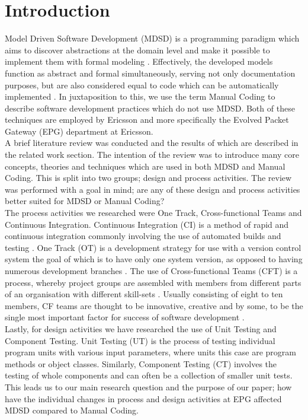 \documentclass[fina_report_innit.tex]{subfiles}
\begin{document}
\section{Introduction}

Model Driven Software Development (MDSD) is a programming paradigm which aims to discover abstractions at the domain level and make it possible to implement them with formal modeling \cite{stahl2006model}. Effectively, the developed models function as abstract and formal simultaneously, serving not only documentation purposes, but are also considered equal to code which can be automatically implemented \cite{stahl2006model}. In juxtaposition to this, we use the term Manual Coding to describe software development practices which do not use MDSD. Both of these techniques are employed by Ericsson and more specifically the Evolved Packet Gateway (EPG) department at Ericsson.
\\

A brief literature review was conducted and the results of which are described in the related work section. The intention of the review was to introduce many core concepts, theories and techniques which are used in both MDSD and Manual Coding. This is split into two groups; design and process activities. The review was performed with a goal in mind; are any of these design and process activities better suited for MDSD or Manual Coding?
\\

The process activities we researched were One Track, Cross-functional Teams and Continuous Integration. Continuous Integration (CI) is a method of rapid and continuous integration commonly involving the use of automated builds and testing \cite{sommerville10software}. One Track (OT) is a development strategy for use with a version control system the goal of which is to have only one system version, as opposed to having numerous development branches \cite{hribar2008first}. The use of Cross-functional Teams (CFT) is a process, whereby project groups are assembled with members from different parts of an organisation with different skill-sets \cite{henke1993perspective} \cite{ghobadi2011challenges}. Usually consisting of eight to ten members, CF teams are thought to be innovative, creative \cite{ghobadi2011challenges} and by some, to be the single most important factor for success of software development \cite{marchwinski2000technical}.
\\

Lastly, for design activities we have researched the use of Unit Testing and Component Testing. Unit Testing (UT) is the process of testing individual program units with various input parameters, where units this case are program methods or object classes. Similarly, Component Testing (CT) involves the testing of whole components and can often be a collection of smaller unit tests. This leads us to our main research question and the purpose of our paper; how have the individual changes in process and design activities at EPG affected MDSD compared to Manual Coding.
\\
\end{document}
